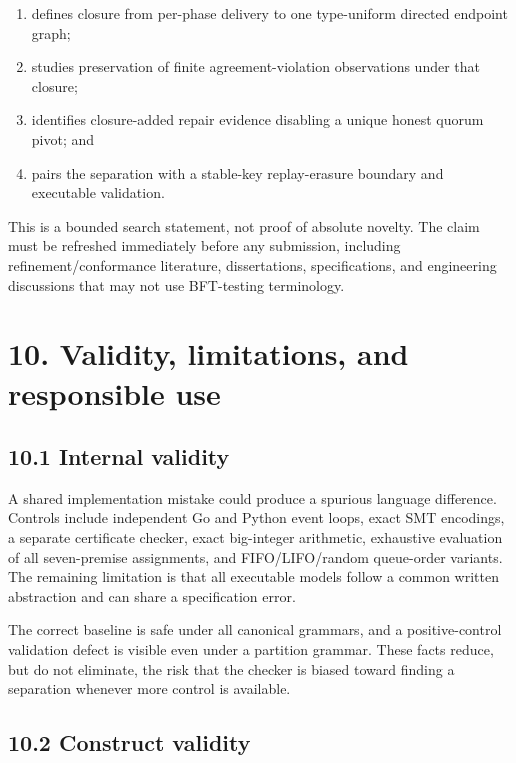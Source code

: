\documentclass[10pt,a4paper]{article}
\newcommand{\tightlist}{\setlength{\itemsep}{0pt}\setlength{\parskip}{0pt}}
\begin{document}
\begin{enumerate}
\def\labelenumi{\arabic{enumi}.}
\tightlist
\item
  defines closure from per-phase delivery to one type-uniform directed
  endpoint graph;
\item
  studies preservation of finite agreement-violation observations under
  that closure;
\item
  identifies closure-added repair evidence disabling a unique honest
  quorum pivot; and
\item
  pairs the separation with a stable-key replay-erasure boundary and
  executable validation.
\end{enumerate}

This is a bounded search statement, not proof of absolute novelty. The
claim must be refreshed immediately before any submission, including
refinement/conformance literature, dissertations, specifications, and
engineering discussions that may not use BFT-testing terminology.

\section{10. Validity, limitations, and responsible
use}\label{validity-limitations-and-responsible-use}

\subsection{10.1 Internal validity}\label{internal-validity}

A shared implementation mistake could produce a spurious language
difference. Controls include independent Go and Python event loops,
exact SMT encodings, a separate certificate checker, exact big-integer
arithmetic, exhaustive evaluation of all seven-premise assignments, and
FIFO/LIFO/random queue-order variants. The remaining limitation is that
all executable models follow a common written abstraction and can share
a specification error.

The correct baseline is safe under all canonical grammars, and a
positive-control validation defect is visible even under a partition
grammar. These facts reduce, but do not eliminate, the risk that the
checker is biased toward finding a separation whenever more control is
available.

\subsection{10.2 Construct validity}\label{construct-validity}
\end{document}
